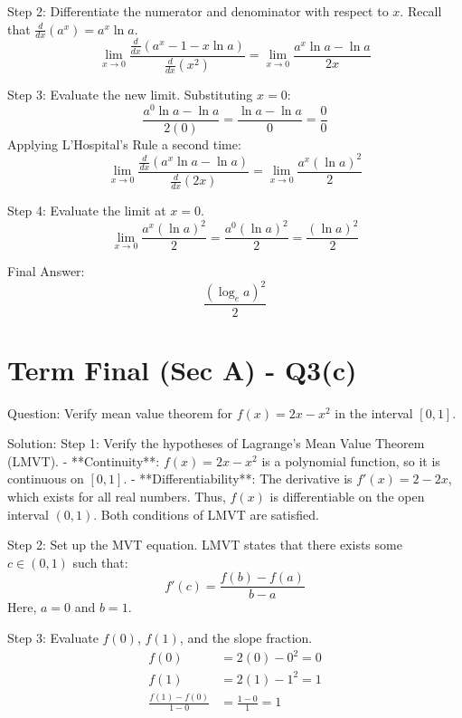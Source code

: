 \documentclass{article}
\begin{document}
Step 2: Differentiate the numerator and denominator with respect to $x$.
Recall that $\frac{d}{dx}(a^x) = a^x \ln a$.
\[
\lim_{x \to 0} \frac{\frac{d}{dx}\left( a^x - 1 - x \ln a \right)}{\frac{d}{dx}(x^2)} = \lim_{x \to 0} \frac{a^x \ln a - \ln a}{2x}
\]

Step 3: Evaluate the new limit.
Substituting $x = 0$:
\[
\frac{a^0 \ln a - \ln a}{2(0)} = \frac{\ln a - \ln a}{0} = \frac{0}{0}
\]
Applying L'Hospital's Rule a second time:
\[
\lim_{x \to 0} \frac{\frac{d}{dx}\left( a^x \ln a - \ln a \right)}{\frac{d}{dx}(2x)} = \lim_{x \to 0} \frac{a^x (\ln a)^2}{2}
\]

Step 4: Evaluate the limit at $x = 0$.
\[
\lim_{x \to 0} \frac{a^x (\ln a)^2}{2} = \frac{a^0 (\ln a)^2}{2} = \frac{(\ln a)^2}{2}
\]

Final Answer:
\[
\boxed{\frac{(\log_e a)^2}{2}}
\]

\section*{Term Final (Sec A) - Q3(c)}
Question:
Verify mean value theorem for $f(x) = 2x - x^2$ in the interval $[0,1]$.

Solution:
Step 1: Verify the hypotheses of Lagrange's Mean Value Theorem (LMVT).
- **Continuity**: $f(x) = 2x - x^2$ is a polynomial function, so it is continuous on $[0, 1]$.
- **Differentiability**: The derivative is $f'(x) = 2 - 2x$, which exists for all real numbers. Thus, $f(x)$ is differentiable on the open interval $(0, 1)$.
Both conditions of LMVT are satisfied.

Step 2: Set up the MVT equation.
LMVT states that there exists some $c \in (0, 1)$ such that:
\[
f'(c) = \frac{f(b) - f(a)}{b - a}
\]
Here, $a = 0$ and $b = 1$.

Step 3: Evaluate $f(0)$, $f(1)$, and the slope fraction.
\begin{align*}
    f(0) &= 2(0) - 0^2 = 0 \\
    f(1) &= 2(1) - 1^2 = 1 \\
    \frac{f(1) - f(0)}{1 - 0} &= \frac{1 - 0}{1} = 1
\end{align*}
\end{document}
